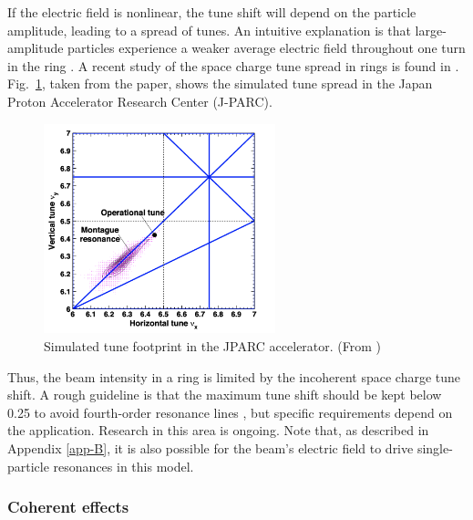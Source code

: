If the electric field is nonlinear, the tune shift will depend on the particle amplitude, leading to a spread of tunes. An intuitive explanation is that large-amplitude particles experience a weaker average electric field throughout one turn in the ring \cite{Franchetti2017}. A recent study of the space charge tune spread in rings is found in \cite{Hotchi2020}. Fig.~\ref{fig:jparc_montague}, taken from the paper, shows the simulated tune spread in the Japan Proton Accelerator Research Center (J-PARC).
%
\begin{figure}[!p]
    \centering
    \includegraphics[width=0.6\textwidth]{Images/chapter1/montague.png}
    \caption{Simulated tune footprint in the JPARC accelerator. (From \cite{Hotchi2020})}
    \label{fig:jparc_montague}
\end{figure}
%

Thus, the beam intensity in a ring is limited by the incoherent space charge tune shift. A rough guideline is that the maximum tune shift should be kept below 0.25 to avoid fourth-order resonance lines \cite{book:Reiser}, but specific requirements depend on the application. Research in this area is ongoing. Note that, as described in Appendix \ref{app-B}, it is also possible for the beam's electric field to drive single-particle resonances in this model.



\subsubsection{Coherent effects}

